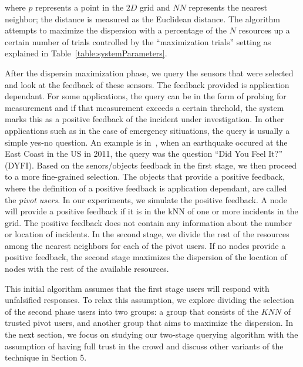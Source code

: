 \documentclass{acm_proc_article-sp}
\begin{document}
where $p$ represents a point in the $2D$ grid and $NN$ represents the nearest neighbor; the distance is measured as the Euclidean distance. The algorithm attempts to maximize the dispersion with a percentage of the $N$ resources up a certain number of trials controlled by the ``maximization trials'' setting as explained in Table~\ref{table:systemParameters}. \par
After the dispersin maximization phase, we query the sensors that were selected and look at the feedback of these sensors. The feedback provided is application dependant. For some applications, the query can be in the form of probing for measurement and if that measurement exceeds a certain threhold, the system marks this as a positive feedback of the incident under investigation. In other applications such as in the case of emergency sitiuations, the query is usually a simple yes-no question. An example is in~\cite{crooks2013earthquake}, when an earthquake occured at the East Coast in the US in 2011, the query was the question ``Did You Feel It?'' (DYFI). Based on the senors/objects feedback in the first stage, we then proceed to a more fine-grained selection. The objects that provide a positive feedback, where the definition of a positive feedback is application dependant, are called the \textit{pivot users}. In our experiments, we simulate the positive feedback. A node will provide a positive feedback if it is in the kNN of one or more incidents in the grid. The positive feedback does not contain any information about the number or location of incidents. In the second stage, we divide the rest of the resources among the nearest neighbors for each of the pivot users. If no nodes provide a positive feedback, the second stage maximizes the dispersion of the location of nodes with the rest of the available resources. \par

This initial algorithm assumes that the first stage users will respond with unfalsified responses. To relax this assumption, we explore dividing the selection of the second phase users into two groups: a group that consists of the $KNN$ of trusted pivot users, and another group that aims to maximize the dispersion. In the next section, we focus on studying our two-stage querying algorithm with the assumption of having full trust in the crowd and discuss other variants of the technique in Section 5.\par
\end{document}
